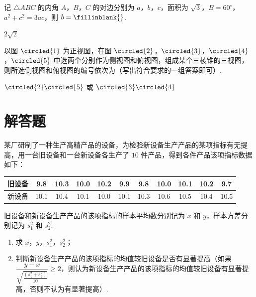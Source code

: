 \begin{problem}
记 \(\triangle ABC\) 的内角 \(A\)，\(B\)，\(C\) 的对边分别为 \(a\)，\(b\)，\(c\)，面积为 \(\sqrt3\)，\(B=60^\circ\)，\(a^2+c^2=3ac\)，则 \(b=\fillinblank{}\).
\end{problem}

\begin{answer}
\(2\sqrt2\)
\end{answer}

\begin{problem}
以图 \(\circled{1}\) 为正视图，在图 \(\circled{2}\)，\(\circled{3}\)，\(\circled{4}\)，\(\circled{5}\) 中选两个分别作为侧视图和俯视图，组成某个三棱锥的三视图，则所选侧视图和俯视图的编号依次为\fillinblank{}（写出符合要求的一组答案即可）.

\end{problem}

\begin{answer}
\(\circled{2}\circled{5}\) 或 \(\circled{3}\circled{4}\)
\end{answer}

\section{解答题}

\begin{problem}
某厂研制了一种生产高精产品的设备，为检验新设备生产产品的某项指标有无提高，用一台旧设备和一台新设备各生产了 \(10\) 件产品，得到各件产品该项指标数据如下：

\begin{center}
\begin{tabular}{|c|*{10}{c|}}
\hline
旧设备 & 9.8 & 10.3 & 10.0 & 10.2 & 9.9 & 9.8 & 10.0 & 10.1 & 10.2 & 9.7 \\
\hline
新设备 & 10.1 & 10.4 & 10.1 & 10.0 & 10.1 & 10.3 & 10.6 & 10.5 & 10.4 & 10.5 \\
\hline
\end{tabular}
\end{center}

旧设备和新设备生产产品的该项指标的样本平均数分别记为 \(x\) 和 \(y\)，样本方差分别记为 \(s_1^2\) 和 \(s_2^2\).

\begin{enumerate}
\item 求 \(x\)，\(y\)，\(s_1^2\)，\(s_2^2\)；

\item 判断新设备生产产品的该项指标的均值较旧设备是否有显著提高（如果 \(\dfrac{y-x}{\sqrt{\frac{\left( s_1^2+s_2^2 \right)}{10}}}\ge 2\)，则认为新设备生产产品的该项指标的均值较旧设备有显著提高，否则不认为有显著提高）.
\end{enumerate}
\end{problem}

